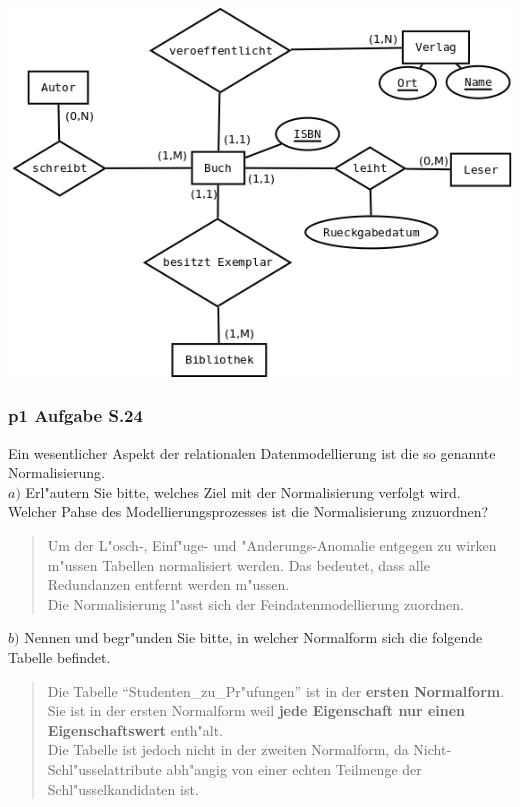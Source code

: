 \bigskip

\noindent
\includegraphics[scale=0.5]{./inc/p1_umlaufgabe}

\subsubsection{p1 Aufgabe S.24}
Ein wesentlicher Aspekt der relationalen Datenmodellierung ist die so genannte Normalisierung.\\
\noindent
$a)$ Erl"autern Sie bitte, welches Ziel mit der Normalisierung verfolgt wird.
Welcher Pahse des Modellierungsprozesses ist die Normalisierung zuzuordnen?\\

\begin{quote}
Um der L"osch-, Einf"uge- und "Anderungs-Anomalie entgegen zu wirken m"ussen Tabellen normalisiert werden.
Das bedeutet, dass alle Redundanzen entfernt werden m"ussen.\\
Die Normalisierung l"asst sich der Feindatenmodellierung zuordnen.
\end{quote}

\noindent
$b)$ Nennen und begr"unden Sie bitte, in welcher Normalform sich die folgende Tabelle befindet.\\

\begin{quote}
Die Tabelle "`Studenten\_zu\_Pr"ufungen"' ist in der \textbf{ersten Normalform}.
Sie ist in der ersten Normalform weil \textbf{jede Eigenschaft nur einen Eigenschaftswert} enth"alt.\\
Die Tabelle ist jedoch nicht in der zweiten Normalform, da Nicht-Schl"usselattribute abh"angig von einer echten Teilmenge der Schl"usselkandidaten ist.
\end{quote}

